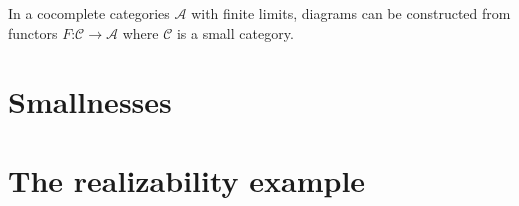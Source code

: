 \documentclass{tac}
\newcommand\hide[1]{}
\newcommand\cat\mathcal
\newcommand\of{\mathord:}
\begin{document}
\begin{example}
In a cocomplete categories $\cat A$ with finite limits, diagrams can be constructed from functors $F\of\cat C\to\cat A$ where $\cat C$ is a small category.
\end{example}



\hide{
collect requirements:
- lccc for the internalized density comonads
- pushouts
- internalized smallness
}

\section{Smallnesses}
\hide{
- nno's cycles & horns
- W-types
-	etc.
}
\section{The realizability example}
\hide{
- simplicial assemblies & modest sets.
- exact completions for pushouts.
- exact completions as examples of homotopy categories.
}
\end{document}
